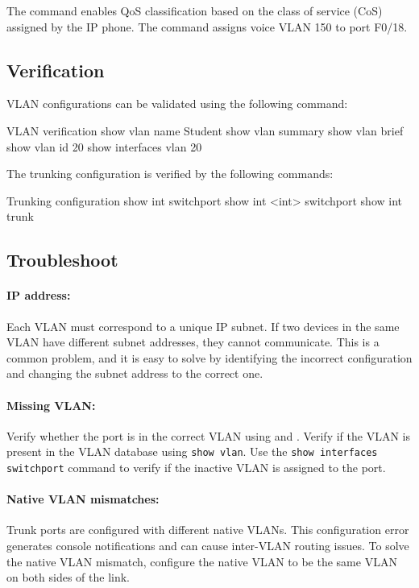 The command  enables QoS classification based on the class of service (CoS) assigned by the IP phone. The command  assigns  voice VLAN 150 to port F0/18. 

\subsection{Verification}

VLAN configurations can be validated using the following command:

\begin{sexylisting}{VLAN verification}
show vlan name Student
show vlan summary
show vlan brief
show vlan id 20
show interfaces vlan 20
\end{sexylisting}

The trunking configuration is verified by the following commands:

\begin{sexylisting}{Trunking configuration}
show int switchport
show int <int> switchport
show int trunk
\end{sexylisting}

\subsection{Troubleshoot}

\paragraph{IP address:} Each VLAN must correspond to a unique IP subnet. If two devices in the same VLAN have different subnet addresses, they cannot communicate. This is a common problem, and it is easy to solve by identifying the incorrect configuration and changing the subnet address to the correct one.

\paragraph{Missing VLAN:} Verify whether the port is in the correct VLAN using  and . Verify if the VLAN is present in the VLAN database using \verb|show vlan|. Use the \verb|show interfaces switchport| command to verify if the inactive VLAN is assigned to the port.


\paragraph{Native VLAN mismatches:} Trunk ports are configured with different native VLANs. This configuration error generates console notifications and can cause inter-VLAN routing issues. To solve the native VLAN mismatch, configure the native VLAN to be the same VLAN on both sides of the link.

